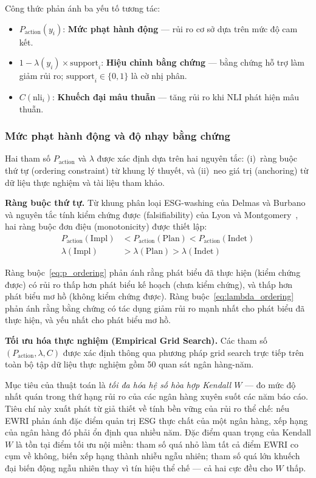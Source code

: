 \noindent Công thức phản ánh ba yếu tố tương tác:
\begin{itemize}
    \item $P_{\text{action}}(y_i)$: \textbf{Mức phạt hành động} --- rủi ro cơ sở dựa trên mức độ cam kết.
    \item $1 - \lambda(y_i) \times \text{support}_i$: \textbf{Hiệu chỉnh bằng chứng} --- bằng chứng hỗ trợ làm giảm rủi ro; $\text{support}_i \in \{0, 1\}$ là cờ nhị phân.
    \item $C(\text{nli}_i)$: \textbf{Khuếch đại mâu thuẫn} --- tăng rủi ro khi NLI phát hiện mâu thuẫn.
\end{itemize}


\subsubsection{Mức phạt hành động và độ nhạy bằng chứng}
Hai tham số $P_{\text{action}}$ và $\lambda$ được xác định dựa trên hai nguyên tắc: (i)~ràng buộc thứ tự (ordering constraint) từ khung lý thuyết, và (ii)~neo giá trị (anchoring) từ dữ liệu thực nghiệm và tài liệu tham khảo.

\textbf{Ràng buộc thứ tự.} Từ khung phân loại ESG-washing của Delmas và Burbano~\cite{delmas2011drivers} và nguyên tắc tính kiểm chứng được (falsifiability) của Lyon và Montgomery~\cite{lyon2015means}, hai ràng buộc đơn điệu (monotonicity) được thiết lập:
\begin{align}
    P_{\text{action}}(\text{Impl}) &< P_{\text{action}}(\text{Plan}) < P_{\text{action}}(\text{Indet})
    \label{eq:p_ordering} \\
    \lambda(\text{Impl}) &> \lambda(\text{Plan}) > \lambda(\text{Indet})
    \label{eq:lambda_ordering}
\end{align}

Ràng buộc~\eqref{eq:p_ordering} phản ánh rằng phát biểu đã thực hiện (kiểm chứng được) có rủi ro thấp hơn phát biểu kế hoạch (chưa kiểm chứng), và thấp hơn phát biểu mơ hồ (không kiểm chứng được). Ràng buộc~\eqref{eq:lambda_ordering} phản ánh rằng bằng chứng có tác dụng giảm rủi ro mạnh nhất cho phát biểu đã thực hiện, và yếu nhất cho phát biểu mơ hồ.

\textbf{Tối ưu hóa thực nghiệm (Empirical Grid Search).} Các tham số $(P_{\text{action}}, \lambda, C)$ được xác định thông qua phương pháp grid search trực tiếp trên toàn bộ tập dữ liệu thực nghiệm gồm 50 quan sát ngân hàng-năm.

Mục tiêu của thuật toán là \textit{tối đa hóa hệ số hòa hợp Kendall $W$} --- đo mức độ nhất quán trong thứ hạng rủi ro của các ngân hàng xuyên suốt các năm báo cáo. Tiêu chí này xuất phát từ giả thiết về tính bền vững của rủi ro thể chế: nếu EWRI phản ánh đặc điểm quản trị ESG thực chất của một ngân hàng, xếp hạng của ngân hàng đó phải ổn định qua nhiều năm. Đặc điểm quan trọng của Kendall $W$ là tồn tại điểm tối ưu nội miền: tham số quá nhỏ làm tất cả điểm EWRI co cụm về không, biến xếp hạng thành nhiễu ngẫu nhiên; tham số quá lớn khuếch đại biến động ngẫu nhiên thay vì tín hiệu thể chế --- cả hai cực đều cho $W$ thấp.

